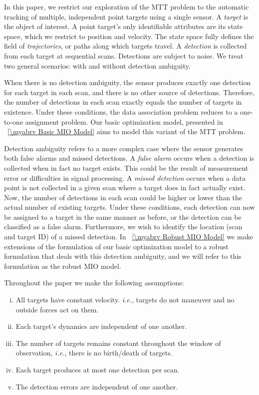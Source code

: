In this paper, we restrict our exploration of the MTT problem to the automatic tracking of multiple, independent point targets using a single sensor. A \textit{target} is the object of interest. A point target's only identifiable attributes are its state space, which we restrict to position and velocity. The state space fully defines the field of \textit{trajectories}, or paths along which targets travel. A \textit{detection} is collected from each target at sequential scans. Detections are subject to noise. We treat two general scenarios: with and without detection ambiguity. 

When there is no detection ambiguity, the sensor produces exactly one detection for each target in each scan, and there is no other source of detections. Therefore, the number of detections in each scan exactly equals the number of targets in existence. Under these conditions, the data association problem reduces to a one-to-one assignment problem. Our basic optimization model, presented in \mysection~\ref{\myabrv Basic MIO Model} aims to model this variant of the MTT problem.

Detection ambiguity refers to a more complex case where the sensor generates both false alarms and missed detections. A \textit{false alarm} occurs when a detection is collected when in fact no target exists. This could be the result of measurement error or difficulties in signal processing. A \textit{missed detection} occurs when a data point is not collected in a given scan where a target does in fact actually exist. Now, the number of detections in each scan could be higher or lower than the actual number of existing targets. Under these conditions, each detection can now be assigned to a target in the same manner as before, or the detection can be classified as a false alarm. Furthermore, we wish to identify the location (scan and target ID) of a missed detection. In \mysection~\ref{\myabrv Robust MIO Model} we make extensions of the formulation of our basic optimization model to a robust formulation that deals with this detection ambiguity, and we will refer to this formulation as the robust MIO model.

Throughout the paper we make the following assumptions:
\begin{assumption}\label{ass:general_assumption}
\leavevmode
\begin{enumerate}[(i)]
\item All targets have constant velocity. \textit{i.e.}, targets do not maneuver and no outside forces act on them.
\item Each target's dynamics are independent of one another.
\item The number of targets remains constant throughout the window of observation, \textit{i.e.}, there is no birth/death of targets.
\item Each target produces at most one detection per scan.
\item The detection errors are independent of one another.
\end{enumerate}
\end{assumption}

